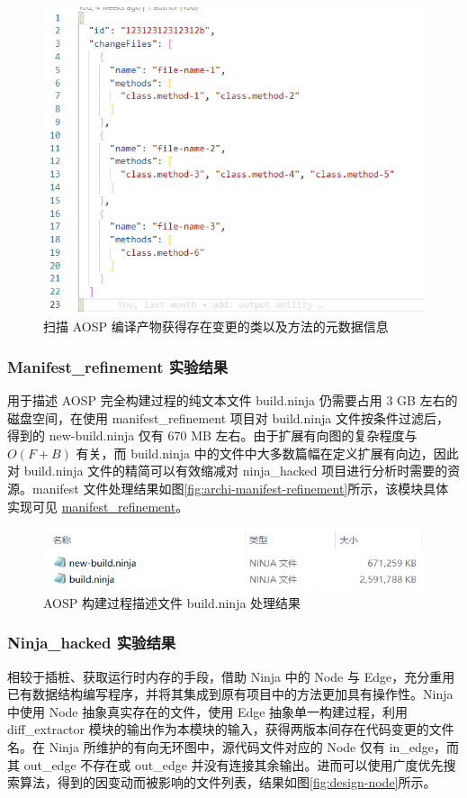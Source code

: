 \begin{figure}[htb]
    \centering
    \includegraphics[width=.4\textwidth]{figures/design-diff-extract.png}
    \caption{扫描 AOSP 编译产物获得存在变更的类以及方法的元数据信息}
    \label{fig:design-diff-extractor}
\end{figure}

\subsubsection{Manifest\_refinement 实验结果}

用于描述 AOSP 完全构建过程的纯文本文件 build.ninja 仍需要占用 3 GB 左右的磁盘空间，在使用 manifest\_refinement 项目对 build.ninja 文件按条件过滤后，得到的 new-build.ninja 仅有 670 MB 左右。由于扩展有向图的复杂程度与 $O(F + B)$ 有关，而 build.ninja 中的文件中大多数篇幅在定义扩展有向边，因此对 build.ninja 文件的精简可以有效缩减对 ninja\_hacked 项目进行分析时需要的资源。manifest 文件处理结果如图\ref{fig:archi-manifest-refinement}所示，该模块具体实现可见 \href{https://github.com/AOSPworking/manifest_refinement}{manifest\_refinement}。

\begin{figure}[htb]
    \centering
    \includegraphics[width=.9\textwidth]{figures/design-manifest.png}
    \caption{AOSP 构建过程描述文件 build.ninja 处理结果}
    \label{fig:design-manifest}
\end{figure}

\subsubsection{Ninja\_hacked 实验结果}

相较于插桩、获取运行时内存的手段，借助 Ninja 中的 Node 与 Edge，充分重用已有数据结构编写程序，并将其集成到原有项目中的方法更加具有操作性。Ninja 中使用 Node 抽象真实存在的文件，使用 Edge 抽象单一构建过程，利用 diff\_extractor 模块的输出作为本模块的输入，获得两版本间存在代码变更的文件名。在 Ninja 所维护的有向无环图中，源代码文件对应的 Node 仅有 in\_edge，而其 out\_edge 不存在或 out\_edge 并没有连接其余输出。进而可以使用广度优先搜索算法，得到的因变动而被影响的文件列表，结果如图\ref{fig:design-node}所示。

